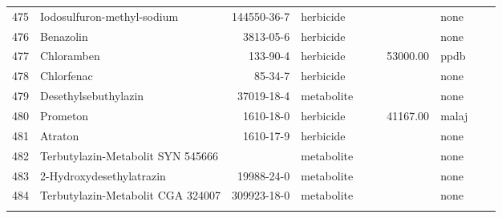 \begin{longtable}{lp{3cm}rlp{0.5cm}p{0.5cm}p{1.5cm}p{1cm}p{1cm}p{1cm}}
  475 & Iodosulfuron-methyl-sodium & 144550-36-7 & herbicide &  &  &  & none &  &  \\ 
  476 & Benazolin & 3813-05-6 & herbicide &  &  &  & none &  &  \\ 
  477 & Chloramben & 133-90-4 & herbicide &  &  & 53000.00 & ppdb &  &  \\ 
  478 & Chlorfenac & 85-34-7 & herbicide &  &  &  & none &  &  \\ 
  479 & Desethylsebuthylazin & 37019-18-4 & metabolite &  &  &  & none &  &  \\ 
  480 & Prometon & 1610-18-0 & herbicide &  &  & 41167.00 & malaj &  &  \\ 
  481 & Atraton & 1610-17-9 & herbicide &  &  &  & none &  &  \\ 
  482 & Terbutylazin-Metabolit SYN 545666 &  & metabolite &  &  &  & none &  &  \\ 
  483 & 2-Hydroxydesethylatrazin & 19988-24-0 & metabolite &  &  &  & none &  &  \\ 
  484 & Terbutylazin-Metabolit CGA 324007 & 309923-18-0 & metabolite &  &  &  & none &  &  \\ 
  \label{tab:phch_var}
\end{longtable}
\endgroup

